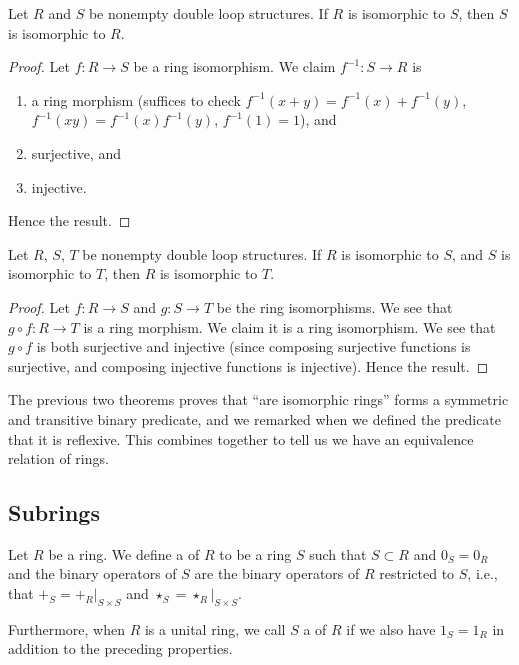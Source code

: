 \begin{theorem}
Let $R$ and $S$ be nonempty double loop structures.
If $R$ is isomorphic to $S$, then $S$ is isomorphic to $R$.
\end{theorem}

\begin{proof}
Let $f\colon R\to S$ be a ring isomorphism. We claim $f^{-1}\colon S\to R$
is
\begin{enumerate}
\item a ring morphism (suffices to check
  $f^{-1}(x+y)=f^{-1}(x)+f^{-1}(y)$, $f^{-1}(xy)=f^{-1}(x)f^{-1}(y)$, $f^{-1}(1)=1$), and
\item surjective, and
\item injective.
\end{enumerate}
Hence the result.
\end{proof}

\begin{theorem}
Let $R$, $S$, $T$ be nonempty double loop structures.
If $R$ is isomorphic to $S$, and $S$ is isomorphic to $T$,
then $R$ is isomorphic to $T$.
\end{theorem}

\begin{proof}
Let $f\colon R\to S$ and $g\colon S\to T$ be the ring isomorphisms.
We see that $g\circ f\colon R\to T$ is a ring morphism. We claim it is
a ring isomorphism. We see that $g\circ f$ is both surjective and
injective (since composing surjective functions is surjective, and
composing injective functions is injective). Hence the result.
\end{proof}

\begin{remark}
The previous two theorems proves that ``are isomorphic rings'' forms a
symmetric and transitive binary predicate, and we remarked when we
defined the predicate that it is reflexive. This combines together to
tell us we have an equivalence relation of rings.
\end{remark}

\subsection{Subrings}

\begin{definition}[Subrings]
Let $R$ be a ring. We define a  of $R$ to be a ring
$S$ such that $S\subset R$ and $0_{S}=0_{R}$ and the binary operators
of $S$ are the binary operators of $R$ restricted to $S$, i.e., that
$+_{S} = +_{R}|_{S\times S}$ and  $\star_{S} = \star_{R}|_{S\times S}$.

Furthermore, when $R$ is a unital ring, we call $S$ a  
of $R$ if we also have $1_{S}=1_{R}$ in addition to the preceding
properties. 
\end{definition}

